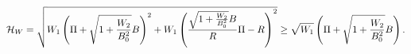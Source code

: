 \begin{equation}
\label{edens3}
{\cal H}_{W} = 
\sqrt{W_1 \left(\Pi + \sqrt{1 + \frac{W_2}{B_0^2}} B \right)^2
      + W_1 \left(\frac{\sqrt{1 + 
\frac{W_2}{B_0^2}} B}{R} \Pi - R
                                                              \right)^2     }
\geq \sqrt{W_1} \left( \Pi + \sqrt{1 + \frac{W_2}{B_0^2}} B \right).
\end{equation}

